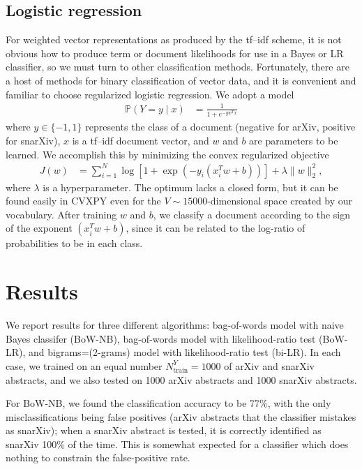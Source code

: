 \documentclass{article}
\renewcommand{\P}{\mathbb{P}}
\begin{document}
\subsection{Logistic regression}
For weighted vector representations as produced by the tf--idf scheme, it is not obvious how to produce term or document likelihoods for use in a Bayes or LR classifier, so we must turn to other classification methods. Fortunately, there are a host of methods for binary classification of vector data, and it is convenient and familiar to choose regularized logistic regression. We adopt a model
%
\begin{align}
  \P(Y=y \mid x) &= \frac{1}{1 + e^{-y w^T x}}
\end{align}
%
where $y \in \{-1, 1\}$ represents the class of a document (negative for arXiv, positive for snarXiv), $x$ is a tf--idf document vector, and $w$ and $b$ are parameters to be learned. We accomplish this by minimizing the convex regularized objective
%
\begin{align}
  J(w) &= \sum_{i=1}^N \log\left[1+ \exp\left(-y_i(x_i^T w + b)\right)\right] + \lambda \|w\|_2^2,
\end{align}
%
where $\lambda$ is a hyperparameter. The optimum lacks a closed form, but it can be found easily in CVXPY even for the $V \sim 15000$-dimensional space created by our vocabulary. After training $w$ and $b$, we classify a document according to the sign of the exponent $(x_i^T w + b)$, since it can be related to the log-ratio of probabilities to be in each class.







\section{Results}
We report results for three different algorithms: bag-of-words model with naive Bayes classifer (BoW-NB), bag-of-words model with likelihood-ratio test (BoW-LR), and bigrams=(2-grams) model with likelihood-ratio test (bi-LR).
In each case, we trained on an equal number $N_\text{train}^Y=1000$ of arXiv and snarXiv abstracts, and we also tested on 1000 arXiv abstracts and 1000 snarXiv abstracts.
%
%

For BoW-NB, we found the classification accuracy to be 77\%, with the only misclassifications being false positives (arXiv abstracts that the classifier mistakes as snarXiv); when a snarXiv abstract is tested, it is correctly identified as snarXiv 100\% of the time.
This is somewhat expected for a classifier which does nothing to constrain the false-positive rate.
\end{document}
